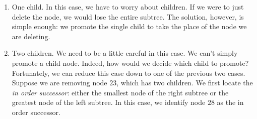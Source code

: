 \begin{enumerate}
\item One child.
In this case, we have to worry about children.
If we were to just delete the node, we would lose the entire subtree.
The solution, however, is simple enough: we promote the single child to take the place of the node we are deleting.
\begin{center}
\begin{minipage}{0.3\textwidth}
\end{minipage}
\begin{minipage}{0.2\textwidth}
   \begin{center}
   \end{center}
\end{minipage}
\begin{minipage}{0.3\textwidth}
\end{minipage}
\end{center}
\item Two children.
We need to be a little careful in this case.
We can't simply promote a child node.
Indeed, how would we decide which child to promote?
Fortunately, we can reduce this case down to one of the previous two cases.
Suppose we are removing node $23$, which has two children.
We first locate the \emph{in order successor}: either the smallest node of the right subtree or the greatest node of the left subtree.
In this case, we identify node $28$ as the in order successor.

\end{enumerate}
